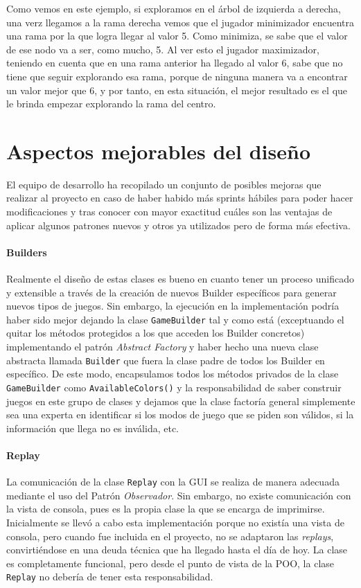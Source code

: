 \documentclass[../DocumentoOficial.tex]{subfiles}
\begin{document}
Como vemos en este ejemplo, si exploramos en el árbol de izquierda a derecha, una verz llegamos a la rama derecha vemos que el jugador minimizador encuentra una rama por la que logra llegar al valor 5. Como minimiza, se sabe que el valor de ese nodo va a ser, como mucho, 5. Al ver esto el jugador maximizador, teniendo en cuenta que en una rama anterior ha llegado al valor 6, sabe que no tiene que seguir explorando esa rama, porque de ninguna manera va a encontrar un valor mejor que 6, y por tanto, en esta situación, el mejor resultado es el que le brinda empezar explorando la rama del centro.

\chapter{Aspectos mejorables del diseño}
El equipo de desarrollo ha recopilado un conjunto de posibles mejoras que realizar al proyecto en caso de haber habido más sprints hábiles para poder hacer modificaciones y tras conocer con mayor exactitud cuáles son las ventajas de aplicar algunos patrones nuevos y otros ya utilizados pero de forma más efectiva.

\subsubsection{Builders}
Realmente el diseño de estas clases es bueno en cuanto tener un proceso unificado y extensible a través de la creación de nuevos Builder específicos para generar nuevos tipos de juegos. Sin embargo, la ejecución en la implementación podría haber sido mejor dejando la clase \texttt{GameBuilder} tal y como está (exceptuando el quitar los métodos protegidos a los que acceden los Builder concretos) implementando el patrón \textit{Abstract Factory} y haber hecho una nueva clase abstracta llamada \texttt{Builder} que fuera la clase padre de todos los Builder en específico. De este modo, encapsulamos todos los métodos privados de la clase \texttt{GameBuilder} como \texttt{AvailableColors()} y la responsabilidad de saber construir juegos en este grupo de clases y dejamos que la clase factoría general simplemente sea una experta en identificar si los modos de juego que se piden son válidos, si la información que llega no es inválida, etc.

\subsubsection{Replay}
La comunicación de la clase \texttt{Replay} con la GUI se realiza de manera adecuada mediante el uso del Patrón \textit{Observador}. Sin embargo, no existe comunicación con la vista de consola, pues es la propia clase la que se encarga de imprimirse. Inicialmente se llevó a cabo esta implementación porque no existía una vista de consola, pero cuando fue incluida en el proyecto, no se adaptaron las \textit{replays}, convirtiéndose en una deuda técnica que ha llegado hasta el día de hoy. La clase es completamente funcional, pero desde el punto de vista de la POO, la clase \texttt{Replay} no debería de tener esta responsabilidad.
\end{document}
